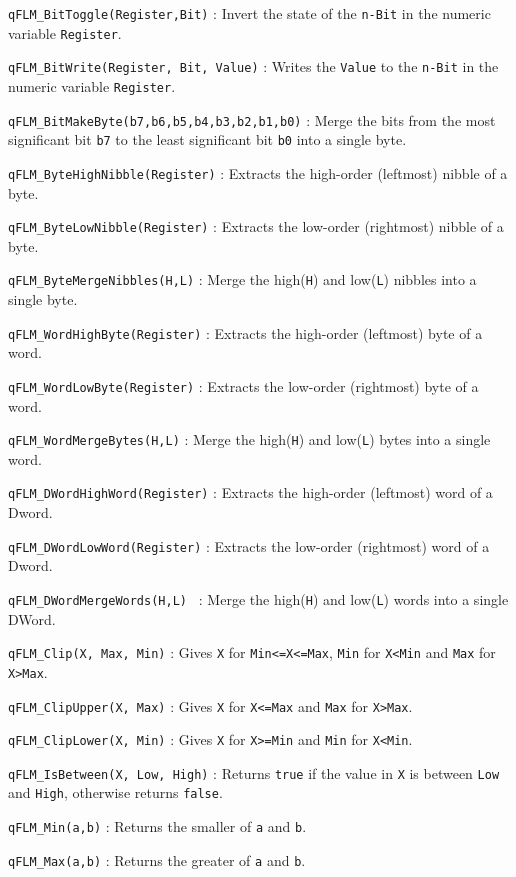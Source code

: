 \lstinline{qFLM_BitToggle(Register,Bit)} : Invert the state of the \lstinline{n-Bit} in the numeric variable \lstinline{Register}.

\lstinline{qFLM_BitWrite(Register, Bit, Value)} : Writes the \lstinline{Value} to the \lstinline{n-Bit} in the numeric variable \lstinline{Register}.

\lstinline{qFLM_BitMakeByte(b7,b6,b5,b4,b3,b2,b1,b0)} : Merge the bits from the most significant bit \lstinline{b7} to the least significant bit \lstinline{b0} into a single byte.

\lstinline{qFLM_ByteHighNibble(Register)} : Extracts the  high-order (leftmost) nibble of a byte.

\lstinline{qFLM_ByteLowNibble(Register)} : Extracts the low-order (rightmost) nibble of a byte.

\lstinline{qFLM_ByteMergeNibbles(H,L)} :  Merge the high(\lstinline{H}) and low(\lstinline{L}) nibbles into a single byte.

\lstinline{qFLM_WordHighByte(Register)} : Extracts the high-order (leftmost) byte of a word.

\lstinline{qFLM_WordLowByte(Register)} : Extracts the low-order (rightmost) byte of a word.

\lstinline{qFLM_WordMergeBytes(H,L)} : Merge the high(\lstinline{H}) and low(\lstinline{L}) bytes into a single word.

\lstinline{qFLM_DWordHighWord(Register)} : Extracts the high-order (leftmost) word of a Dword.

\lstinline{qFLM_DWordLowWord(Register)} : Extracts the low-order (rightmost) word of a Dword.

\lstinline{qFLM_DWordMergeWords(H,L) } : Merge the high(\lstinline{H}) and low(\lstinline{L}) words into a single DWord.

\lstinline{qFLM_Clip(X, Max, Min)} :  Gives \lstinline{X} for \lstinline{Min<=X<=Max}, \lstinline{Min} for \lstinline{X<Min} and \lstinline{Max} for \lstinline{X>Max}.

\lstinline{qFLM_ClipUpper(X, Max)} : Gives \lstinline{X} for \lstinline{X<=Max} and \lstinline{Max} for \lstinline{X>Max}.

\lstinline{qFLM_ClipLower(X, Min)} : Gives \lstinline{X} for \lstinline{X>=Min} and \lstinline{Min} for \lstinline{X<Min}.

\lstinline{qFLM_IsBetween(X, Low, High)} : Returns \lstinline{true} if the value in \lstinline{X} is between \lstinline{Low} and \lstinline{High}, otherwise returns \lstinline{false}.

\lstinline{qFLM_Min(a,b)} : Returns the smaller of \lstinline{a} and \lstinline{b}.

\lstinline{qFLM_Max(a,b)} :  Returns the greater of \lstinline{a} and \lstinline{b}.

\newpage